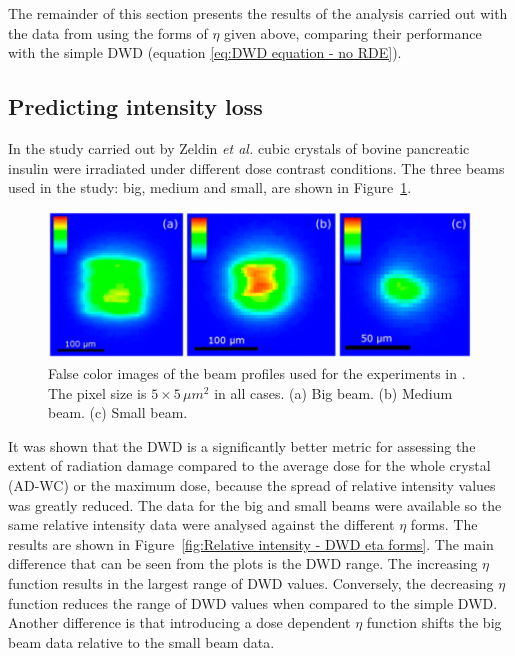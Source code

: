 The remainder of this section presents the results of the analysis carried out with the data from \cite{zeldin2013dwd} using the forms of $\eta$ given above, comparing their performance with the simple DWD (equation \ref{eq:DWD equation - no RDE}).

\subsection{Predicting intensity loss}
\label{sub:Predicting intensity loss}
In the study carried out by Zeldin \textit{et al.} \cite{zeldin2013dwd} cubic crystals of bovine pancreatic insulin were irradiated under different dose contrast conditions.
The three beams used in the study: big, medium and small, are shown in Figure~\ref{fig:Big, medium and small beams - Oli experiment}.
\begin{figure}
  \centering
    \includegraphics[width=1\textwidth]{figures/dwd/Oli_beams.png}
    \caption{False color images of the beam profiles used for the experiments in \cite{zeldin2013dwd}. The pixel size is $\text{5} \times \text{5}\,\mu m^2$ in all cases. (a) Big beam. (b) Medium beam. (c) Small beam.}
    \label{fig:Big, medium and small beams - Oli experiment}
\end{figure}
It was shown that the DWD is a significantly better metric for assessing the extent of radiation damage compared to the average dose for the whole crystal (AD-WC) or the maximum dose, because the spread of relative intensity values was greatly reduced.
The data for the big and small beams were available so the same relative intensity data were analysed against the different $\eta$ forms.
The results are shown in Figure~\ref{fig:Relative intensity - DWD eta forms}.
The main difference that can be seen from the plots is the DWD range.
The increasing $\eta$ function results in the largest range of DWD values.
Conversely, the decreasing $\eta$ function reduces the range of DWD values when compared to the simple DWD.
Another difference is that introducing a dose dependent $\eta$ function shifts the big beam data relative to the small beam data.
